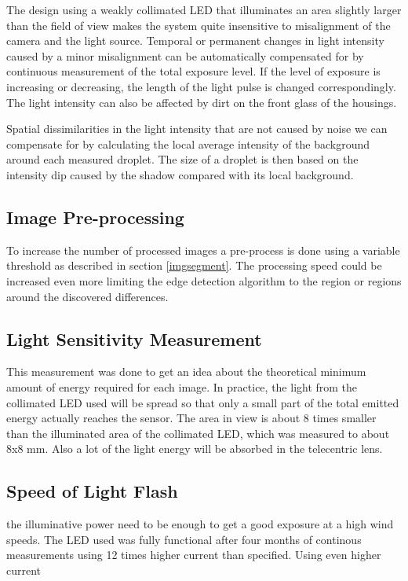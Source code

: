 The design using a weakly collimated LED that illuminates an area slightly larger than the field of view makes the system quite insensitive to misalignment of the camera and the light source. Temporal or permanent changes in light intensity caused by a minor misalignment can be automatically compensated for by continuous measurement of the total exposure level. If the level of exposure is increasing or decreasing, the length of the light pulse is changed correspondingly. The light intensity can also be affected by dirt on the front glass of the housings. 

Spatial dissimilarities in the light intensity that are not caused by noise we can compensate for by calculating the local average intensity of the background around each measured droplet. The size of a droplet is then based on the intensity dip caused by the shadow compared with its local background.

\subsection{Image Pre-processing}

To increase the number of processed images a pre-process is done using a variable threshold as described in section \ref{imgsegment}. The processing speed could be increased even more limiting the edge detection algorithm to the region or regions around the discovered differences.

\subsection{Light Sensitivity Measurement}

This measurement was done to get an idea about the theoretical minimum amount of energy required for each image. In practice, the light from the collimated LED used will be spread so that only a small part of the total emitted energy actually reaches the sensor. The area in view is about 8 times smaller than the illuminated area of the collimated LED, which was measured to about 8x8 mm. Also a lot of the light energy will be absorbed in the telecentric lens.

\subsection{Speed of Light Flash}

the illuminative power need to be enough to get a good exposure at a high wind speeds.
The LED used was fully functional after four months of continous measurements using 12 times higher current than specified. Using even higher current 

